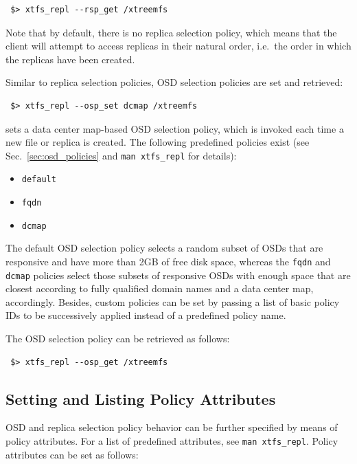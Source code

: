 \documentclass[a4paper,10pt]{book}
\begin{document}
\begin{verbatim}
 $> xtfs_repl --rsp_get /xtreemfs
\end{verbatim}

Note that by default, there is no replica selection policy, which means that the client will attempt to access replicas in their natural order, i.e.\ the order in which the replicas have been created.

Similar to replica selection policies, OSD selection policies are set and retrieved:

\begin{verbatim}
 $> xtfs_repl --osp_set dcmap /xtreemfs
\end{verbatim}

sets a data center map-based OSD selection policy, which is invoked each time a new file or replica is created. The following predefined policies exist (see Sec.\ \ref{sec:osd_policies} and \texttt{man xtfs\_repl} for details):

\begin{itemize}
 \item \texttt{default}
 \item \texttt{fqdn}
 \item \texttt{dcmap}
\end{itemize}

The default OSD selection policy selects a random subset of OSDs that are responsive and have more than 2GB of free disk space, whereas the \texttt{fqdn} and \texttt{dcmap} policies select those subsets of responsive OSDs with enough space that are closest according to fully qualified domain names and a data center map, accordingly. Besides, custom policies can be set by passing a list of basic policy IDs to be successively applied instead of a predefined policy name.

The OSD selection policy can be retrieved as follows:

\begin{verbatim}
 $> xtfs_repl --osp_get /xtreemfs
\end{verbatim}

\subsection{Setting and Listing Policy Attributes}

OSD and replica selection policy behavior can be further specified by means of policy attributes. For a list of predefined attributes, see \texttt{man xtfs\_repl}. Policy attributes can be set as follows:
\end{document}
